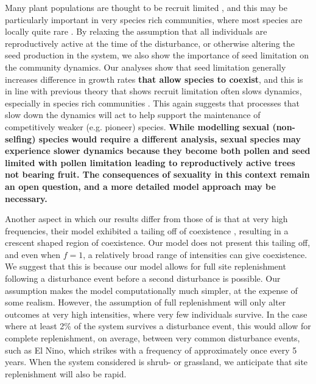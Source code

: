 Many plant populations are thought to be recruit limited \citep[e.g.][]{clark1998stages,eriksson1992seed,svenning2005seed}, and this may be particularly important in very species rich communities, where most species are locally quite rare \citep[e.g.][]{svenning2005seed}. By relaxing the assumption that all individuals are reproductively active at the time of the disturbance, or otherwise altering the seed production in the system, we also show the importance of seed limitation on the community dynamics. Our analyses show that seed limitation generally increases difference in growth rates \textbf{that allow species to coexist}, and this is in line with previous theory that shows recruit limitation often slows dynamics, especially in species rich communities \citep{hurtt1995consequences}. This again suggests that processes that slow down the dynamics will act to help support the maintenance of competitively weaker (e.g. pioneer) species. \textbf{While modelling sexual (non-selfing) species would require a different analysis, sexual species may experience slower dynamics because they become both pollen and seed limited with pollen limitation leading to reproductively active trees not bearing fruit. The consequences of sexuality in this context remain an open question, and a more detailed model approach may be necessary.}

Another aspect in which our results differ from those of  \cite{miller2011frequency} is that at very high frequencies, their model exhibited a tailing off of coexistence \citep[Figure 1 of ][]{miller2011frequency}, resulting in a crescent shaped region of coexistence. Our model does not  present this tailing off, and even when $f=1$, a relatively broad range of intensities can give coexistence. We suggest that this is because our model allows for full site replenishment following a disturbance event before a second disturbance is possible. Our assumption makes the model computationally much simpler, at the expense of some realism. However, the assumption of full replenishment will only alter outcomes at very high intensities, where very few individuals survive. In the case where at least 2\% of the system survives a disturbance event, this would allow for complete replenishment, on average, between very common disturbance events, such as El Nino, which strikes with a frequency of approximately once every 5 years. When the system considered is shrub- or grassland, we anticipate that site replenishment will also be rapid.

